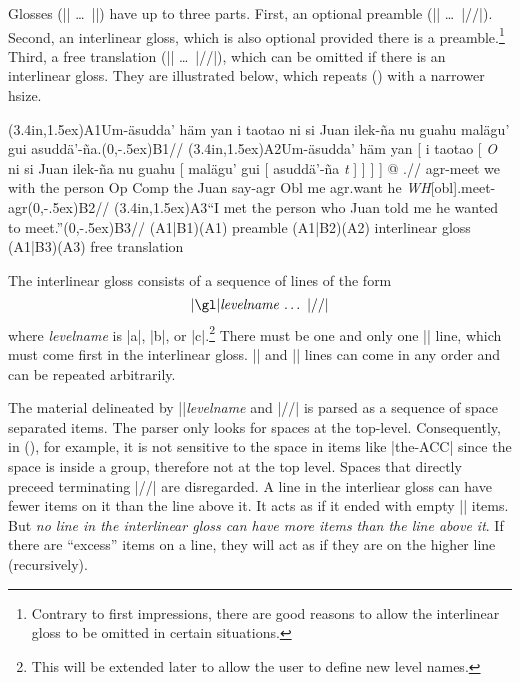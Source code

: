 Glosses (|\begingl| \dots\ |\endgl|) have up to three
parts.  First, an optional preamble (|\glpreamble| \dots\ |//|).
Second, an interlinear gloss, which is also optional provided there is
a preamble.\footnote{%
Contrary to first impressions, there are good reasons to allow the
interlinear gloss to be omitted in certain situations.}  Third, a free
translation (|\glft| \dots\ |//|), which can be omitted if there is an
interlinear gloss. They are illustrated below, which repeats (\lastx)
with a narrower hsize.

\begingroup

\ex
\def\TOP{\pnode(3.4in,1.5ex)}%
\def\BOT{\pnode(0,-.5ex)}%
\begingl[glwidth=3.2in]
\glpreamble \TOP{A1}Um-\"asudda' h\"am yan i taotao ni si Juan
ilek-\~na nu guahu mal\"agu' gui
asudd\"a'-\~na.\BOT{B1}//
\gla \TOP{A2}Um-\"asudda' h\"am yan [ i taotao [ {\it O\/} ni si Juan
ilek-\~na nu guahu [ mal\"agu' gui [ asudd\"a'-\~na {\it
t\/} ] ] ] ] @ .//
\glb agr-meet we with the person Op Comp the Juan say-agr Obl me
agr.want he {\it WH\/}[obl].meet-agr\BOT{B2}//
\glft \TOP{A3}``I met the person who Juan told me he wanted to
meet.''\BOT{B3}//
\endgl
\SpecialCoor
\psbrace[ref=lC](A1|B1)(A1){ preamble}
\psbrace[ref=lC](A1|B2)(A2){ interlinear gloss}
\psbrace[ref=lC](A1|B3)(A3){ free translation}
\xe
\endgroup

The interlinear gloss consists of a sequence of lines of the form
$$\hbox{|\gl|{\it levelname\/} \dots\ |//|}$$
where {\it levelname\/} is |a|, |b|, or |c|.\footnote{%
This will be extended later to allow the user to define new level
names.}  There must be one and only one |\gla| line, which must come
first in the interlinear gloss. |\glb| and |\glc| lines can come in
any order and can be repeated arbitrarily.

The material delineated by |\gl|{\it levelname\/} and |//| is parsed
as a sequence of space separated items.  The parser only looks for
spaces at the top-level.  Consequently, in (\blastx), for example, it
is not sensitive to the space in items like |the-{\sc ACC}| since the
space is inside a group, therefore not at the top level.  Spaces that
directly preceed terminating |//| are disregarded.  A line in the
interliear gloss can have fewer items on it than the line above it. It
acts as if it ended with empty |{}| items.  But {\it no line in the
interlinear gloss can have more items than the line above it}.  If
there are ``excess'' items on a line, they will act as if they are on
the higher line (recursively).

%
%


